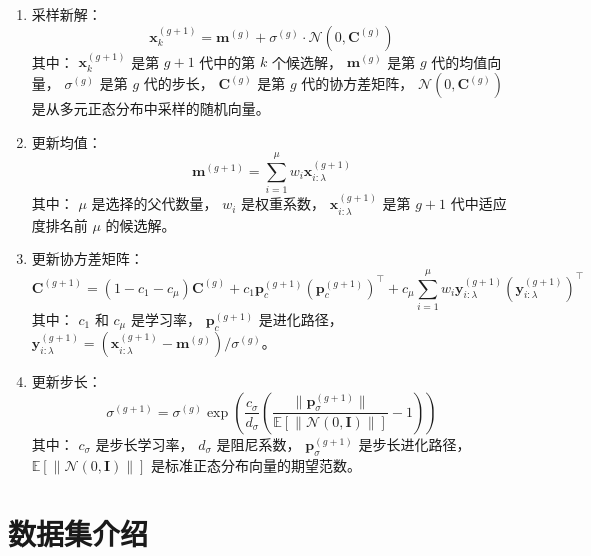 \documentclass[master]{thesis-uestc}
\begin{document}
\begin{enumerate}[label={(\arabic*)}]
 \item 采样新解：
\begin{equation}
\mathbf{x}_k^{(g+1)} = \mathbf{m}^{(g)} + \sigma^{(g)} \cdot \mathcal{N}(0, \mathbf{C}^{(g)})
\label{eq:sample}
\end{equation}
其中：
    \(\mathbf{x}_k^{(g+1)}\) 是第 \(g+1\) 代中的第 \(k\) 个候选解，
    \(\mathbf{m}^{(g)}\) 是第 \(g\) 代的均值向量，
    \(\sigma^{(g)}\) 是第 \(g\) 代的步长，
    \(\mathbf{C}^{(g)}\) 是第 \(g\) 代的协方差矩阵，
    \(\mathcal{N}(0, \mathbf{C}^{(g)})\) 是从多元正态分布中采样的随机向量。

 \item 更新均值：
\begin{equation}
\mathbf{m}^{(g+1)} = \sum_{i=1}^{\mu} w_i \mathbf{x}_{i:\lambda}^{(g+1)}
\label{eq:mean_update}
\end{equation}
其中：
    \(\mu\) 是选择的父代数量，
    \(w_i\) 是权重系数，
    \(\mathbf{x}_{i:\lambda}^{(g+1)}\) 是第 \(g+1\) 代中适应度排名前 \(\mu\) 的候选解。

 \item 更新协方差矩阵：
\begin{equation}
\mathbf{C}^{(g+1)} = (1 - c_1 - c_\mu) \mathbf{C}^{(g)} + c_1 \mathbf{p}_c^{(g+1)} (\mathbf{p}_c^{(g+1)})^\top + c_\mu \sum_{i=1}^{\mu} w_i \mathbf{y}_{i:\lambda}^{(g+1)} (\mathbf{y}_{i:\lambda}^{(g+1)})^\top
\label{eq:covariance_update}
\end{equation}
其中：
    \(c_1\) 和 \(c_\mu\) 是学习率，
    \(\mathbf{p}_c^{(g+1)}\) 是进化路径，
    \(\mathbf{y}_{i:\lambda}^{(g+1)} = (\mathbf{x}_{i:\lambda}^{(g+1)} - \mathbf{m}^{(g)}) / \sigma^{(g)}\)。

 \item 更新步长：
\begin{equation}
\sigma^{(g+1)} = \sigma^{(g)} \exp\left(\frac{c_\sigma}{d_\sigma} \left(\frac{\|\mathbf{p}_\sigma^{(g+1)}\|}{\mathbb{E}[\|\mathcal{N}(0, \mathbf{I})\|]} - 1\right)\right)
\label{eq:stepsize_update}
\end{equation}
其中：
    \(c_\sigma\) 是步长学习率，
    \(d_\sigma\) 是阻尼系数，
    \(\mathbf{p}_\sigma^{(g+1)}\) 是步长进化路径，
    \(\mathbb{E}[\|\mathcal{N}(0, \mathbf{I})\|]\) 是标准正态分布向量的期望范数。
\end{enumerate}
\FloatBarrier  %

\section{数据集介绍}
\end{document}
